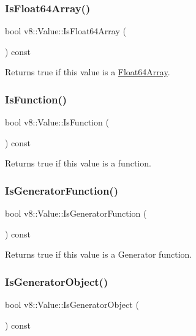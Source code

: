 \subsubsection{\texorpdfstring{Is\+Float64\+Array()}{IsFloat64Array()}}
{\footnotesize\ttfamily bool v8\+::\+Value\+::\+Is\+Float64\+Array (\begin{DoxyParamCaption}{ }\end{DoxyParamCaption}) const}

Returns true if this value is a \mbox{\hyperlink{classv8_1_1Float64Array}{Float64\+Array}}. \mbox{\label{classv8_1_1Value_ac7a649d482c41cfc6281a4215a091a6d}} 
\subsubsection{\texorpdfstring{Is\+Function()}{IsFunction()}}
{\footnotesize\ttfamily bool v8\+::\+Value\+::\+Is\+Function (\begin{DoxyParamCaption}{ }\end{DoxyParamCaption}) const}

Returns true if this value is a function. \mbox{\label{classv8_1_1Value_ac0a7fcb3b244a921e5574e6f34fa9b07}} 
\subsubsection{\texorpdfstring{Is\+Generator\+Function()}{IsGeneratorFunction()}}
{\footnotesize\ttfamily bool v8\+::\+Value\+::\+Is\+Generator\+Function (\begin{DoxyParamCaption}{ }\end{DoxyParamCaption}) const}

Returns true if this value is a Generator function. \mbox{\label{classv8_1_1Value_af6f2d3199fe8b5eee219ef42574293ac}} 
\subsubsection{\texorpdfstring{Is\+Generator\+Object()}{IsGeneratorObject()}}
{\footnotesize\ttfamily bool v8\+::\+Value\+::\+Is\+Generator\+Object (\begin{DoxyParamCaption}{ }\end{DoxyParamCaption}) const}

